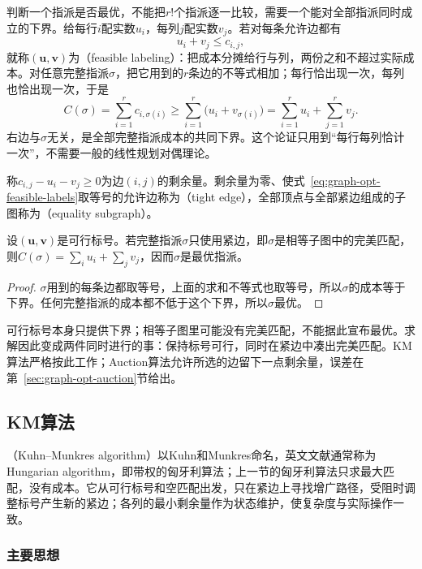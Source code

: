 判断一个指派是否最优，不能把$r!$个指派逐一比较，需要一个能对全部指派同时成立的下界。给每行$i$配实数$u_i$，每列$j$配实数$v_j$。若对每条允许边都有
\begin{equation}
  u_i+v_j\leq c_{i,j},
  \label{eq:graph-opt-feasible-labels}
\end{equation}
就称$(\bm u,\bm v)$为（feasible labeling）：把成本分摊给行与列，两份之和不超过实际成本。对任意完整指派$\sigma$，把它用到的$r$条边的不等式相加；每行恰出现一次，每列也恰出现一次，于是
\[
  C(\sigma)=\sum_{i=1}^r c_{i,\sigma(i)}\geq\sum_{i=1}^r\bigl(u_i+v_{\sigma(i)}\bigr)=\sum_{i=1}^r u_i+\sum_{j=1}^r v_j.
\]
右边与$\sigma$无关，是全部完整指派成本的共同下界。这个论证只用到“每行每列恰计一次”，不需要一般的线性规划对偶理论。

称$c_{i,j}-u_i-v_j\geq0$为边$(i,j)$的剩余量。剩余量为零、使式~\eqref{eq:graph-opt-feasible-labels}取等号的允许边称为（tight edge），全部顶点与全部紧边组成的子图称为（equality subgraph）。
\begin{theorem}[紧边指派的最优性]
\label{thm:graph-opt-tight-assignment}
设$(\bm u,\bm v)$是可行标号。若完整指派$\sigma$只使用紧边，即$\sigma$是相等子图中的完美匹配，则$C(\sigma)=\sum_iu_i+\sum_jv_j$，因而$\sigma$是最优指派。
\end{theorem}

\begin{proof}
$\sigma$用到的每条边都取等号，上面的求和不等式也取等号，所以$\sigma$的成本等于下界。任何完整指派的成本都不低于这个下界，所以$\sigma$最优。
\end{proof}

可行标号本身只提供下界；相等子图里可能没有完美匹配，不能据此宣布最优。求解因此变成两件同时进行的事：保持标号可行，同时在紧边中凑出完美匹配。KM算法严格按此工作；Auction算法允许所选的边留下一点剩余量，误差在第~\ref{sec:graph-opt-auction}节给出。

\subsection{KM算法}
\label{sec:graph-opt-hungarian}

（Kuhn--Munkres algorithm）以Kuhn和Munkres命名，英文文献通常称为Hungarian algorithm，即带权的匈牙利算法；上一节的匈牙利算法只求最大匹配，没有成本。它从可行标号和空匹配出发，只在紧边上寻找增广路径，受阻时调整标号产生新的紧边；各列的最小剩余量作为状态维护，使复杂度与实际操作一致。

\subsubsection{主要思想}

